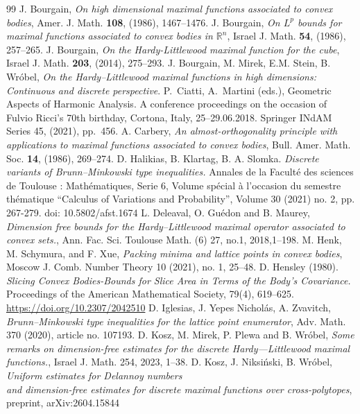 \documentclass[10pt,a4paper]{amsart}
\numberwithin{equation}{section}
\newcommand{\R}{\mathbb{R}}
\begin{document}
\begin{thebibliography}{99}
 J. Bourgain, \textit{On high dimensional maximal functions associated to convex bodies}, Amer. J. Math. {\bf 108}, (1986), 1467--1476.
 J. Bourgain, \textit{On $L^p$ bounds for maximal functions associated to convex bodies in $\R^n$}, Israel J. Math. {\bf 54}, (1986), 257--265.
 J. Bourgain, \textit{On the Hardy-Littlewood maximal function for the cube}, Israel J. Math. {\bf 203}, (2014), 275--293.
 J. Bourgain, M. Mirek, E.M. Stein, B. Wr\'obel, \textit{On the Hardy--Littlewood maximal functions in high dimensions: Continuous and discrete perspective}. P.\ Ciatti, A.\ Martini (eds.), Geometric Aspects of Harmonic Analysis. A conference proceedings on the occasion of Fulvio Ricci's 70th birthday, Cortona, Italy, 25--29.06.2018. Springer INdAM Series 45, (2021), pp.\ 456.
 A. Carbery, \textit{An almost-orthogonality principle with applications to maximal functions associated to convex bodies}, Bull. Amer. Math. Soc. {\bf 14}, (1986), 269--274.
 D. Halikias, B. Klartag, B. A. Slomka. \textit{Discrete variants of Brunn–Minkowski type inequalities.} Annales de la Faculté des sciences de Toulouse : Mathématiques, Serie 6, Volume spécial à l’occasion du semestre thématique “Calculus of Variations and Probability”, Volume 30 (2021) no. 2, pp. 267-279. doi: 10.5802/afst.1674
 L. Deleaval, O. Guédon and B. Maurey, \emph{Dimension free bounds for the Hardy–Littlewood maximal operator associated to convex sets.}, Ann. Fac. Sci. Toulouse Math. (6) 27, no.1, 2018,1--198.
 M. Henk, M. Schymura, and F. Xue, \textit{Packing minima and lattice points in convex bodies}, Moscow J. Comb. Number Theory 10 (2021), no. 1, 25--48.
 D. Hensley (1980). \textit{ Slicing Convex Bodies-Bounds for Slice Area in Terms of the Body’s Covariance.} Proceedings of the American Mathematical Society, 79(4), 619–625. \url{https://doi.org/10.2307/2042510}
 D. Iglesias, J. Yepes Nicholás, A. Zvavitch, \textit{Brunn–Minkowski type inequalities for the lattice point enumerator}, Adv. Math. 370 (2020), article no. 107193.
 D. Kosz, M. Mirek, P. Plewa and B. Wróbel, \emph{Some remarks on dimension-free estimates for the discrete Hardy—Littlewood maximal functions.}, Israel J. Math. 254, 2023, 1--38.
 D. Kosz, J. Niksiński, B. Wróbel, \textit{Uniform estimates for Delannoy numbers \\ and dimension-free estimates for discrete maximal functions over cross-polytopes}, preprint, arXiv:2604.15844

\end{thebibliography}
\end{document}
